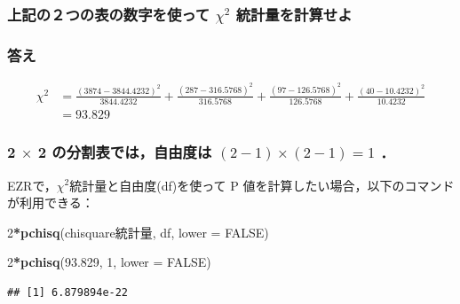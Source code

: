 \documentclass[11pt,]{problemset}
\newenvironment{Shaded}{\begin{snugshade}}{\end{snugshade}}
\newcommand{\DataTypeTok}[1]{\textcolor[rgb]{0.13,0.29,0.53}{#1}}
\newcommand{\DecValTok}[1]{\textcolor[rgb]{0.00,0.00,0.81}{#1}}
\newcommand{\FloatTok}[1]{\textcolor[rgb]{0.00,0.00,0.81}{#1}}
\newcommand{\KeywordTok}[1]{\textcolor[rgb]{0.13,0.29,0.53}{\textbf{#1}}}
\newcommand{\NormalTok}[1]{#1}
\newcommand{\OperatorTok}[1]{\textcolor[rgb]{0.81,0.36,0.00}{\textbf{#1}}}
\newcommand{\OtherTok}[1]{\textcolor[rgb]{0.56,0.35,0.01}{#1}}
\begin{document}
\hypertarget{-chi2-}{%
\subsubsection{\texorpdfstring{上記の２つの表の数字を使って \(\chi^2\)
統計量を計算せよ}{上記の２つの表の数字を使って \textbackslash{}chi\^{}2 統計量を計算せよ}}\label{-chi2-}}

\hypertarget{-6}{%
\subsubsection{答え}\label{-6}}

\[
\begin{aligned}
\chi^2 & = \frac{(3874 - 3844.4232)^2}{3844.4232} + \frac{(287 - 316.5768)^2}{316.5768} + \frac{(97 - 126.5768)^2}{126.5768} + \frac{(40 - 10.4232)^2}{10.4232} \\
       & = 93.829
\end{aligned}
\]

\hypertarget{times-2--2-1times2-1-1}{%
\subsubsection{\texorpdfstring{2 \(\times\) 2 の分割表では，自由度は
\((2-1)\times(2-1) = 1\)
．}{2 \textbackslash{}times 2 の分割表では，自由度は (2-1)\textbackslash{}times(2-1) = 1 ．}}\label{times-2--2-1times2-1-1}}

EZRで，\(\chi^2\)統計量と自由度(df)を使って P
値を計算したい場合，以下のコマンドが利用できる：

\begin{Shaded}
\begin{Highlighting}[]
\DecValTok{2}\OperatorTok{*}\KeywordTok{pchisq}\NormalTok{(chisquare統計量, df, }\DataTypeTok{lower =} \OtherTok{FALSE}\NormalTok{)}
\end{Highlighting}
\end{Shaded}

\begin{Shaded}
\begin{Highlighting}[]
\DecValTok{2}\OperatorTok{*}\KeywordTok{pchisq}\NormalTok{(}\FloatTok{93.829}\NormalTok{, }\DecValTok{1}\NormalTok{, }\DataTypeTok{lower =} \OtherTok{FALSE}\NormalTok{)}
\end{Highlighting}
\end{Shaded}

\begin{verbatim}
## [1] 6.879894e-22
\end{verbatim}
\end{document}
